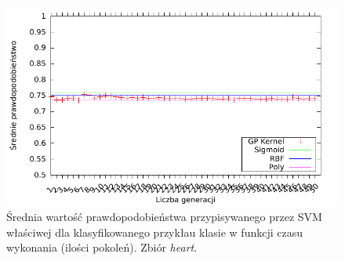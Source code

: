 	\begin{figure}
		\includegraphics[scale=0.90]{figures/results/probability/probability-heart}
		\caption{Średnia wartość prawdopodobieństwa przypisywanego przez SVM właściwej dla klasyfikowanego przykłau klasie w funkcji czasu wykonania (ilości pokoleń). Zbiór \emph{heart}.\label{fig:probability-heart}}
	\end{figure}

%
	
